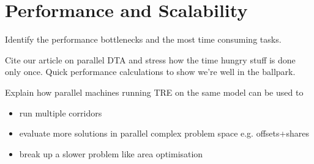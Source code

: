 \section{Performance and Scalability}
Identify the performance bottlenecks and the most time consuming tasks.

Cite our article on parallel DTA and stress how the time hungry stuff is done only once.
Quick performance calculations to show we're well in the ballpark.

Explain how parallel machines running TRE on the same model can be used to
\begin{itemize}
\item run multiple corridors
\item evaluate more solutions in parallel complex problem space e.g. offsets+shares
\item break up a slower problem like area optimisation
\end{itemize}


